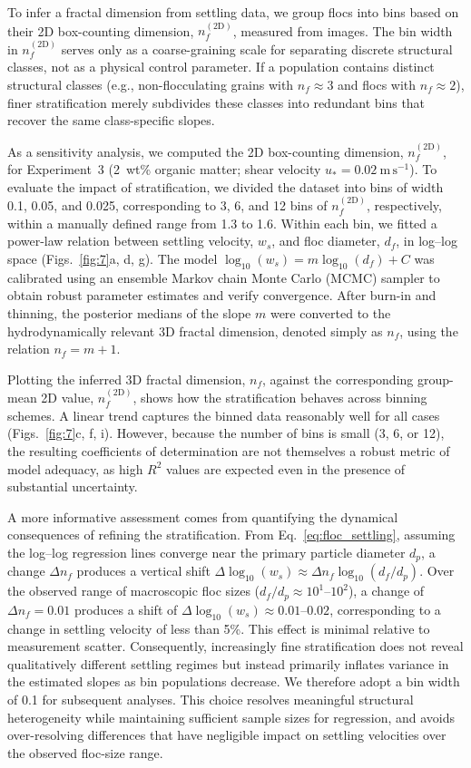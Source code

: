 \documentclass{agujournal2019}
\begin{document}
To infer a fractal dimension from settling data, we group flocs into bins based on their 2D box-counting dimension, $n_f^{(\mathrm{2D})}$, measured from images. The bin width in $n_f^{(\mathrm{2D})}$ serves only as a coarse-graining scale for separating discrete structural classes, not as a physical control parameter. If a population contains distinct structural classes (e.g., non-flocculating grains with $n_f \approx 3$ and flocs with $n_f \approx 2$), finer stratification merely subdivides these classes into redundant bins that recover the same class-specific slopes. 

As a sensitivity analysis, we computed the 2D box-counting dimension, $n_f^{(\mathrm{2D})}$, for Experiment~3 (2~wt\% organic matter; shear velocity $u_* = 0.02~\mathrm{m\,s^{-1}}$). To evaluate the impact of stratification, we divided the dataset into bins of width 0.1, 0.05, and 0.025, corresponding to 3, 6, and 12 bins of $n_f^{(\mathrm{2D})}$, respectively, within a manually defined range from 1.3 to 1.6. Within each bin, we fitted a power-law relation between settling velocity, $w_s$, and floc diameter, $d_f$, in log--log space (Figs.~\ref{fig:7}a, d, g). The model $\log_{10}(w_s) = m \log_{10}(d_f) + C$ was calibrated using an ensemble Markov chain Monte Carlo (MCMC) sampler to obtain robust parameter estimates and verify convergence. After burn-in and thinning, the posterior medians of the slope $m$ were converted to the hydrodynamically relevant 3D fractal dimension, denoted simply as $n_f$, using the relation $n_f = m + 1$.

Plotting the inferred 3D fractal dimension, $n_f$, against the corresponding group-mean 2D value, $n_f^{(\mathrm{2D})}$, shows how the stratification behaves across binning schemes. A linear trend captures the binned data reasonably well for all cases (Figs.~\ref{fig:7}c, f, i). However, because the number of bins is small (3, 6, or 12), the resulting coefficients of determination are not themselves a robust metric of model adequacy, as high $R^2$ values are expected even in the presence of substantial uncertainty.

A more informative assessment comes from quantifying the dynamical consequences of refining the stratification. From Eq.~\eqref{eq:floc_settling}, assuming the log--log regression lines converge near the primary particle diameter $d_p$, a change $\Delta n_f$ produces a vertical shift $\Delta \log_{10}(w_s) \approx \Delta n_f \log_{10}(d_f/d_p)$. Over the observed range of macroscopic floc sizes ($d_f/d_p \approx 10^1$--$10^2$), a change of $\Delta n_f = 0.01$ produces a shift of $\Delta \log_{10}(w_s) \approx 0.01$--$0.02$, corresponding to a change in settling velocity of less than 5\%. This effect is minimal relative to measurement scatter. Consequently, increasingly fine stratification does not reveal qualitatively different settling regimes but instead primarily inflates variance in the estimated slopes as bin populations decrease. We therefore adopt a bin width of 0.1 for subsequent analyses. This choice resolves meaningful structural heterogeneity while maintaining sufficient sample sizes for regression, and avoids over-resolving differences that have negligible impact on settling velocities over the observed floc-size range.
\end{document}
